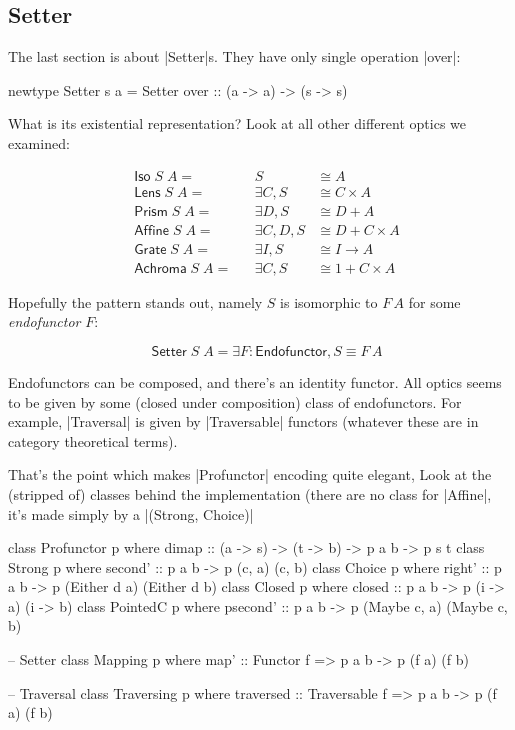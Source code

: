 \documentclass{article}
\begin{document}
\subsection{Setter}

The last section is about |Setter|s. They have only single operation |over|:

\begin{code}
newtype Setter s a = Setter { over :: (a -> a) -> (s -> s) }
\end{code}

What is its existential representation? Look at all other different optics
we examined:

\begin{equation}
\begin{aligned}
  \quad \mathsf{Iso}\;S\;A     =&&  S &\cong A  \\
  \quad \mathsf{Lens}\;S\;A    =&& \exists C, S &\cong C \times A \\
  \quad \mathsf{Prism}\;S\;A   =&& \exists D, S &\cong D + A \\
  \quad \mathsf{Affine}\;S\;A  =&& \exists C, D, S &\cong D + C \times A \\
  \quad \mathsf{Grate}\;S\;A   =&& \exists I, S &\cong I \to A \\
  \quad \mathsf{Achroma}\;S\;A =&& \exists C, S &\cong 1 + C \times A
\end{aligned}
\end{equation}

Hopefully the pattern stands out, namely $S$ is isomorphic to $F\,A$ for some
\emph{endofunctor} $F$:

\begin{equation}
  \quad \mathsf{Setter}\;S\;A = \exists F : \mathsf{Endofunctor}, S \equiv F\,A
\end{equation}

Endofunctors can be composed, and there's an identity functor.
All optics seems to be given by some (closed under composition) class of
endofunctors. For example, |Traversal| is given by |Traversable| functors
(whatever these are in category theoretical terms).

That's the point which makes |Profunctor| encoding quite elegant,
Look at the (stripped of) classes behind the implementation
(there are no class for |Affine|, it's made simply by a |(Strong, Choice)|

\begin{code}
class Profunctor p where dimap    :: (a -> s) -> (t -> b) -> p a b -> p s t
class Strong p     where second'  :: p a b -> p (c, a) (c, b)
class Choice p     where right'   :: p a b -> p (Either d a) (Either d b)
class Closed p     where closed   :: p a b -> p (i -> a) (i -> b)
class PointedC p   where psecond' :: p a b -> p (Maybe c, a) (Maybe c, b)

-- Setter
class Mapping p    where map'      :: Functor f     => p a b -> p (f a) (f b)

-- Traversal
class Traversing p where traversed :: Traversable f => p a b -> p (f a) (f b)
\end{code}
\end{document}
